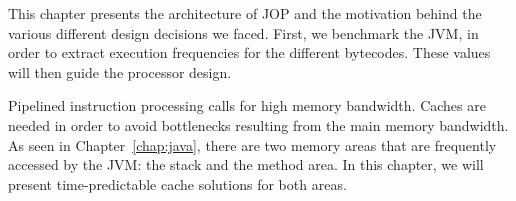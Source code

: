 This chapter presents the architecture of JOP and the motivation
behind the various different design decisions we faced. First, we
benchmark the JVM, in order to extract execution frequencies for the
different bytecodes. These values will then guide the processor
design.

Pipelined instruction processing calls for high memory bandwidth.
Caches are needed in order to avoid bottlenecks resulting from the
main memory bandwidth. As seen in Chapter~\ref{chap:java}, there are
two memory areas that are frequently accessed by the JVM: the stack
and the method area. In this chapter, we will present
time-predictable cache solutions for both areas.
